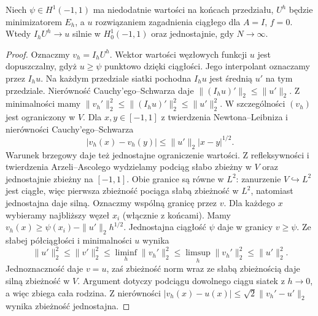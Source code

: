 \begin{twierdzenie}
\label{thm:pde29-discrete-convergence}
Niech $\psi\in H^1(-1,1)$ ma niedodatnie
wartości na końcach przedziału, $U^h$ będzie
minimizatorem $E_h$, a $u$ rozwiązaniem
zagadnienia ciągłego dla $A=I$, $f=0$.
Wtedy $I_hU^h\to u$ silnie w $H_0^1(-1,1)$
oraz jednostajnie, gdy $N\to\infty$.
\end{twierdzenie}
\begin{proof}
Oznaczmy $v_h=I_hU^h$. Wektor wartości węzłowych
funkcji $u$ jest dopuszczalny, gdyż $u\ge\psi$
punktowo dzięki ciągłości. Jego interpolant
oznaczamy przez $I_hu$.
Na każdym przedziale siatki pochodna $I_hu$
jest średnią $u'$ na tym przedziale.
Nierówność Cauchy'ego--Schwarza daje
$\|(I_hu)'\|_2\le\|u'\|_2$.
Z minimalności mamy
$\|v_h'\|_2^2\le\|(I_hu)'\|_2^2\le\|u'\|_2^2$.
W szczególności $(v_h)$ jest ograniczony w $V$.
Dla $x,y\in[-1,1]$ z twierdzenia Newtona--Leibniza
i nierówności Cauchy'ego--Schwarza
\[
 |v_h(x)-v_h(y)|\le \|u'\|_2|x-y|^{1/2}.
\]
Warunek brzegowy daje też jednostajne ograniczenie
wartości. Z refleksywności i twierdzenia
Arzeli--Ascolego wydzielamy podciąg słabo zbieżny
w $V$ oraz jednostajnie zbieżny na $[-1,1]$.
Obie granice są równe w $L^2$: zanurzenie
$V\hookrightarrow L^2$ jest ciągłe, więc
pierwsza zbieżność pociąga słabą zbieżność
w $L^2$, natomiast jednostajna daje silną.
Oznaczmy wspólną granicę przez $v$.
Dla każdego $x$ wybieramy najbliższy węzeł $x_i$
(włącznie z końcami). Mamy
$v_h(x)\ge\psi(x_i)-\|u'\|_2 h^{1/2}$.
Jednostajna ciągłość $\psi$ daje w granicy $v\ge\psi$.
Ze słabej półciągłości i minimalności $u$ wynika
\[
 \|u'\|_2^2\le\|v'\|_2^2\le
 \liminf_h\|v_h'\|_2^2\le
 \limsup_h\|v_h'\|_2^2\le\|u'\|_2^2.
\]
Jednoznaczność daje $v=u$, zaś zbieżność norm
wraz ze słabą zbieżnością daje silną zbieżność
w $V$. Argument dotyczy podciągu dowolnego ciągu
siatek z $h\to0$, a więc zbiega cała rodzina.
Z nierówności $|v_h(x)-u(x)|\le
\sqrt2\|v_h'-u'\|_2$ wynika zbieżność jednostajna.
\end{proof}

